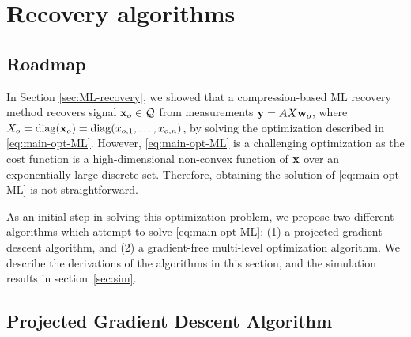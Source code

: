 \documentclass[onecolumn]{IEEEtran}
\newcommand{\wv}{{\bf w}}
\begin{document}



\section{Recovery algorithms}\label{sec:inference}

\subsection{Roadmap}
In Section \ref{sec:ML-recovery}, we showed that a compression-based ML recovery
method  recovers signal ${\bf x}_o\in\mathcal{Q}$ from measurements  $\yv=AX\wv_o$, where
$X_o=\mathop{\rm diag}\nolimits({{\bf x}_o})=\mathop{\rm diag}\nolimits({x_{o,1}},\ldots,{x_{o,n}})$, by solving the
optimization described in \eqref{eq:main-opt-ML}. However, \eqref{eq:main-opt-ML} is a challenging
optimization as the cost function is a high-dimensional non-convex function of
${\bf x}$ over an exponentially large discrete set. Therefore, obtaining the solution of \eqref{eq:main-opt-ML} is not straightforward.

As an initial step in solving this optimization problem, we propose two different algorithms which attempt to solve \eqref{eq:main-opt-ML}:
(1) a projected gradient descent algorithm, and (2) a gradient-free multi-level optimization algorithm.
We describe the derivations of the algorithms in this section, and the simulation results in section~\ref{sec:sim}.

\subsection{Projected Gradient Descent Algorithm}\label{ssec:pgd}
\end{document}
